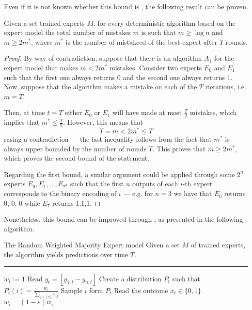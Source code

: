 \documentclass[a4paper, 12pt]{report}
\begin{document}
    Even if it is not known whether this bound is , the following result can be proven.

    \begin{framedthm}{}
        Given a set trained experts $M$, for every deterministic algorithm based on the expert model the total number of mistakes $m$ is such that $m \ge \log n$ and $m \ge 2{m^*}$, where $m^*$ is the number of mistakced of the best expert after $T$ rounds.
    \end{framedthm}

    \begin{proof}
        By way of contradiction, suppose that there is an algorithm $A_1$ for the expert model that makes $m < 2{m^*}$ mistakes. Consider two experts $E_0$ and $E_1$ such that the first one always returns 0 and the second one always returns 1. Now, suppose that the algorithm makes a mistake on each of the $T$ iterations, i.e. $m = T$.

        Then, at time $t = T$ either $E_0$ or $E_1$ will have made at most $\tfrac{T}{2}$ mistakes, which implies that $m^* \le \tfrac{T}{2}$. However, this means that $$T = m < 2{m^*} \le T$$ rasing a contradiction --- the last inequality follows from the fact that $m^*$ is always upper bounded by the number of rounds $T$. This proves that $m \ge 2{m^*}$, which proves the second bound of the statement.

        Regarding the first bound, a similar argument could be applied through some $2^n$ experts $E_0, E_1, \ldots, E_{2^n}$ such that the first $n$ outputs of each $i$-th expert corresponds to the binary encoding of $i$ --- e.g. for $n = 3$ we have that $E_0$ returns 0, 0, 0 while $E_7$ returns 1,1,1.
    \end{proof}

    Nonetheless, this bound can be improved through , as presented in the following algorithm.

    \begin{framedalgo}{The Random Weighted Majority Expert model}
        Given a set $M$ of trained experts, the algorithm yields predictions over time $T$. \\
        \hrule

        \quad
        \begin{algorithmic}[1]
                    \State $w_i := 1$
                \EndFor
                    \State Read $y_t = [y_{1, t} \ \cdots \ y_{n, t}]$
                    \State Create a distribution $P_t$ such that $P_t(i) = \tfrac{w_i}{\sum_{j \in [n]}{w_j}}$
                    \State Sample $i$ form $P_t$
                    \State Read the outcome $x_t \in \{0, 1\}$
                                \State $w_i = (1 - \varepsilon) w_i$
                            \EndIf
                        \EndFor
                    \EndIf
                \EndFor
            \EndFunction
        \end{algorithmic}
    \end{framedalgo}
\end{document}
